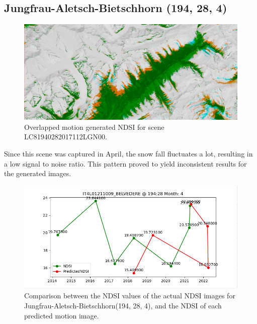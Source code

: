 \documentclass[12pt, a4paper]{report}
\begin{document}
	\subsection{Jungfrau-Aletsch-Bietschhorn (194, 28, 4)}
	
	\begin{figure}[h!]
		\centering
		\includegraphics[width=\linewidth]{../images/experiment_1940284_image.png}
		\caption{Overlapped motion generated NDSI for scene LC81940282017112LGN00.}
		\label{fig:experiment_1940284_image}
	\end{figure}

	Since this scene was captured in April, the snow fall fluctuates a lot, resulting in a low signal to noise ratio. This pattern proved to yield inconsistent results for the generated images.
	
	\begin{figure}[h!]
		\centering
		\includegraphics[scale=0.5]{../images/experiment_194284.png}
		\caption{Comparison between the NDSI values of the actual NDSI images for Jungfrau-Aletsch-Bietschhorn(194, 28, 4), and the NDSI of each predicted motion image.}
		\label{fig:jungfrau_194284}
	\end{figure}

	
\end{document}
